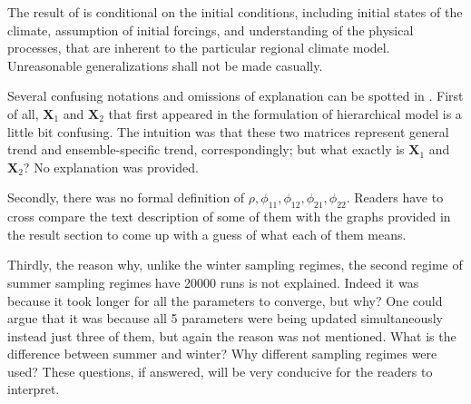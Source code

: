 \documentclass{article}
\begin{document}
The result of \cite{paper} is conditional on the initial conditions, including initial states of the climate, assumption of initial forcings, and understanding of the physical processes, that are inherent to the particular regional climate model. Unreasonable generalizations shall not be made casually.

Several confusing notations and omissions of explanation can be spotted in  \cite{paper}. First of all, $\boldsymbol{X}_1$ and $\boldsymbol{X}_2$ that first appeared in the formulation of hierarchical model is a little bit confusing. The intuition was that these two matrices represent general trend and ensemble-specific trend, correspondingly; but what exactly is $\boldsymbol{X}_1$ and $\boldsymbol{X}_2$? No explanation was provided. 

Secondly, there was no formal definition of $\rho, \phi_{11}, \phi_{12}, \phi_{21}, \phi_{22}$. Readers have to cross compare the text description of some of them with the graphs provided in the result section to come up with a guess of what each of them means. 

Thirdly, the reason why, unlike the winter sampling regimes, the second regime of summer sampling regimes have 20000 runs is not explained. Indeed it was because it took longer for all the parameters to converge, but why? One could argue that it was because all 5 parameters were being updated simultaneously instead just three of them, but again the reason was not mentioned. What is the difference between summer and winter? Why different sampling regimes were used? These questions, if answered, will be very conducive for the readers to interpret. 

 
 
\end{document}
